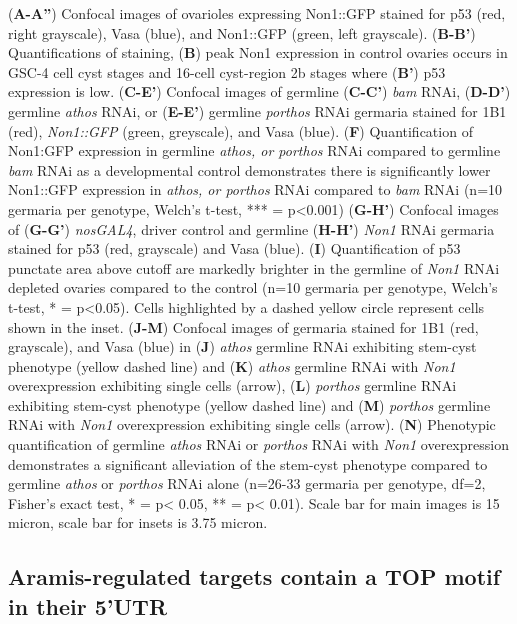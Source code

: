 \documentclass[12pt,oneside]{reedthesis}
\begin{document}
\setlength\parindent{0pt}(\textbf{A-A''}) Confocal images of ovarioles expressing Non1::GFP stained for p53 (red, right grayscale), Vasa (blue), and Non1::GFP (green, left grayscale). (\textbf{B-B'}) Quantifications of staining, (\textbf{B}) peak Non1 expression in control ovaries occurs in GSC-4 cell cyst stages and 16-cell cyst-region 2b stages where (\textbf{B'}) p53 expression is low. (\textbf{C-E'}) Confocal images of germline (\textbf{C-C'}) \emph{bam} RNAi, (\textbf{D-D'}) germline \emph{athos} RNAi, or (\textbf{E-E'}) germline \emph{porthos} RNAi germaria stained for 1B1 (red), \emph{Non1::GFP} (green, greyscale), and Vasa (blue). (\textbf{F}) Quantification of Non1:GFP expression in germline \emph{athos, or porthos} RNAi compared to germline \emph{bam} RNAi as a developmental control demonstrates there is significantly lower Non1::GFP expression in \emph{athos, or porthos} RNAi compared to \emph{bam} RNAi (n=10 germaria per genotype, Welch's t-test, *** = p\textless0.001) (\textbf{G-H'}) Confocal images of (\textbf{G-G'}) \emph{nosGAL4}, driver control and germline (\textbf{H-H'}) \emph{Non1} RNAi germaria stained for p53 (red, grayscale) and Vasa (blue). (\textbf{I}) Quantification of p53 punctate area above cutoff are markedly brighter in the germline of \emph{Non1} RNAi depleted ovaries compared to the control (n=10 germaria per genotype, Welch's t-test, * = p\textless0.05). Cells highlighted by a dashed yellow circle represent cells shown in the inset. (\textbf{J-M}) Confocal images of germaria stained for 1B1 (red, grayscale), and Vasa (blue) in (\textbf{J}) \emph{athos} germline RNAi exhibiting stem-cyst phenotype (yellow dashed line) and (\textbf{K}) \emph{athos} germline RNAi with \emph{Non1} overexpression exhibiting single cells (arrow), (\textbf{L}) \emph{porthos} germline RNAi exhibiting stem-cyst phenotype (yellow dashed line) and (\textbf{M}) \emph{porthos} germline RNAi with \emph{Non1} overexpression exhibiting single cells (arrow). (\textbf{N}) Phenotypic quantification of germline \emph{athos} RNAi or \emph{porthos} RNAi with \emph{Non1} overexpression demonstrates a significant alleviation of the stem-cyst phenotype compared to germline \emph{athos} or \emph{porthos} RNAi alone (n=26-33 germaria per genotype, df=2, Fisher's exact test, * = p\textless{} 0.05, ** = p\textless{} 0.01). Scale bar for main images is 15 micron, scale bar for insets is 3.75 micron.

\textbf{\hfill\break
}

\hypertarget{aramis-regulated-targets-contain-a-top-motif-in-their-5utr}{%
\subsection{Aramis-regulated targets contain a TOP motif in their 5'UTR}\label{aramis-regulated-targets-contain-a-top-motif-in-their-5utr}}
\end{document}
